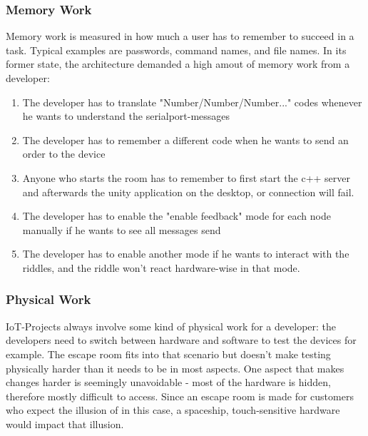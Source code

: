 \subsubsection{Memory Work}
Memory work is measured in how much a user has to remember to succeed in a task. 
Typical examples are passwords, command names, and file names.
In its former state, the architecture demanded a high amout of memory work from a developer:
\begin{enumerate}
    \item The developer has to translate "Number/Number/Number..." codes whenever he wants to understand the serialport-messages 
    \item The developer has to remember a different code when he wants to send an order to the device
    \item Anyone who starts the room has to remember to first start the c++ server and afterwards the unity application on the desktop, or connection will fail.
    \item The developer has to enable the "enable feedback" mode for each node manually if he wants to see all messages send
    \item The developer has to enable another mode if he wants to interact with the riddles, and the riddle won't react hardware-wise in that mode.
\end{enumerate} 

\subsubsection{Physical Work}
IoT-Projects always involve some kind of physical work for a developer: the developers need to switch between hardware and software to test the devices for example.
The escape room fits into that scenario but doesn't make testing physically harder than it needs to be in most aspects. 
One aspect that makes changes harder is seemingly unavoidable - most of the hardware is hidden, therefore mostly difficult to access. 
Since an escape room is made for customers who expect the illusion of in this case, a spaceship, 
touch-sensitive hardware would impact that illusion.
